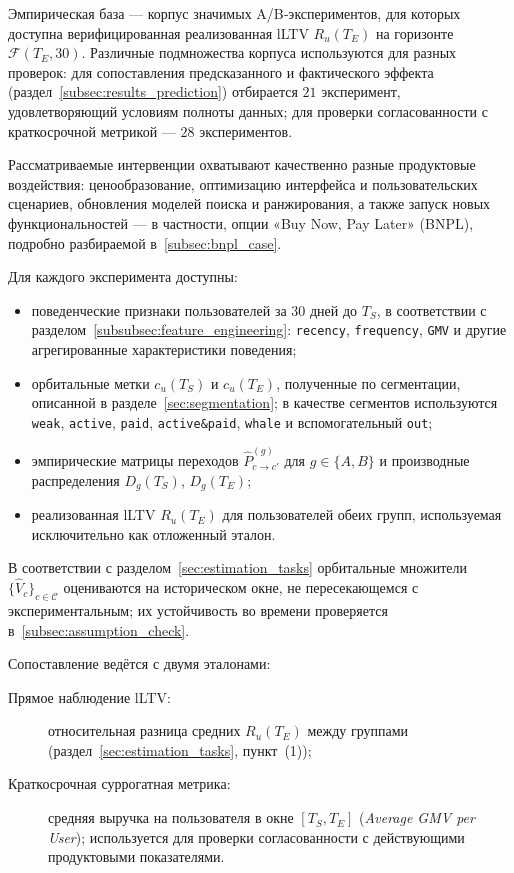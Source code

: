 Эмпирическая база — корпус значимых A/B‑экспериментов, для которых
доступна верифицированная реализованная lLTV $R_u(T_E)$ на горизонте
$\mathcal{F}(T_E, 30)$. Различные подмножества корпуса используются
для разных проверок: для сопоставления предсказанного и фактического
эффекта (раздел~\ref{subsec:results_prediction}) отбирается $21$
эксперимент, удовлетворяющий условиям полноты данных; для проверки
согласованности с краткосрочной метрикой — $28$ экспериментов.

Рассматриваемые интервенции охватывают качественно разные продуктовые
воздействия: ценообразование, оптимизацию интерфейса и пользовательских
сценариев, обновления моделей поиска и ранжирования, а также запуск
новых функциональностей — в частности, опции «Buy Now, Pay Later»
(BNPL), подробно разбираемой в~\ref{subsec:bnpl_case}.

Для каждого эксперимента доступны:
\begin{itemize}
    \item поведенческие признаки пользователей за 30 дней до $T_S$,
          в соответствии с разделом~\ref{subsubsec:feature_engineering}:
          \texttt{recency}, \texttt{frequency}, \texttt{GMV} и другие
          агрегированные характеристики поведения;
    \item орбитальные метки $c_u(T_S)$ и $c_u(T_E)$, полученные по
          сегментации, описанной в разделе~\ref{sec:segmentation};
          в качестве сегментов используются
          \texttt{weak}, \texttt{active}, \texttt{paid},
          \texttt{active\&paid}, \texttt{whale} и вспомогательный
          \texttt{out};
    \item эмпирические матрицы переходов
          $\widehat{P}^{(g)}_{c\to c'}$ для $g\in\{A,B\}$ и
          производные распределения $D_g(T_S)$, $D_g(T_E)$;
    \item реализованная lLTV $R_u(T_E)$ для пользователей обеих
          групп, используемая исключительно как отложенный эталон.
\end{itemize}

В соответствии с разделом~\ref{sec:estimation_tasks} орбитальные
множители $\{\hat{V}_c\}_{c\in\mathcal{C}}$ оцениваются на историческом
окне, не пересекающемся с экспериментальным; их устойчивость во
времени проверяется в~\ref{subsec:assumption_check}.

Сопоставление ведётся с двумя эталонами:
\begin{description}
    \item[Прямое наблюдение lLTV:] относительная разница средних
          $R_u(T_E)$ между группами
          (раздел~\ref{sec:estimation_tasks}, пункт~(1));
    \item[Краткосрочная суррогатная метрика:] средняя выручка на
          пользователя в окне $[T_S, T_E]$ (\textit{Average GMV per
          User}); используется для проверки согласованности с
          действующими продуктовыми показателями.
\end{description}

